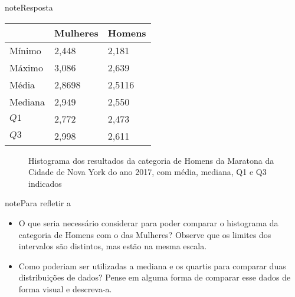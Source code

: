 \begin{sphinxadmonition}{note}{Resposta}

\begin{savenotes}\sphinxattablestart
\centering
{}
\label{\detokenize{PE104-2:id5}}
\sphinxaftercaption
\begin{tabulary}{\linewidth}[t]{|T|T|T|}
\hline
&
Mulheres
&
Homens
\\
\hline
Mínimo
&
2,448
&
2,181
\\
\hline
Máximo
&
3,086
&
2,639
\\
\hline
Média
&
2,8698
&
2,5116
\\
\hline
Mediana
&
2,949
&
2,550
\\
\hline
\(Q1\)
&
2,772
&
2,473
\\
\hline
\(Q3\)
&
2,998
&
2,611
\\
\hline
\end{tabulary}
\par
\sphinxattableend\end{savenotes}

\begin{figure}[H]
\centering
\capstart

\noindent{}
\caption{Histograma dos resultados da categoria de Homens da Maratona da Cidade de Nova York do ano 2017, com média, mediana, Q1 e Q3 indicados}\label{\detokenize{PE104-2:fig-coloque-aqui-o-nome}}\label{\detokenize{PE104-2:id6}}\end{figure}
\end{sphinxadmonition}


\begin{sphinxadmonition}{note}{Para refletir}
a
\begin{itemize}
\item {} 
O que seria necessário considerar para poder comparar o histograma da categoria de Homens com o das Mulheres? Observe que os limites dos intervalos são distintos, mas estão na mesma escala.

\item {} 
Como poderiam ser utilizadas a mediana e os quartis para comparar duas distribuições de dados? Pense em alguma forma de comparar esse dados de forma visual e descreva-a.

\end{itemize}
\end{sphinxadmonition}

\label{\detokenize{PE104-2:ativ-comparacao-de-diferentes-grupos}}

